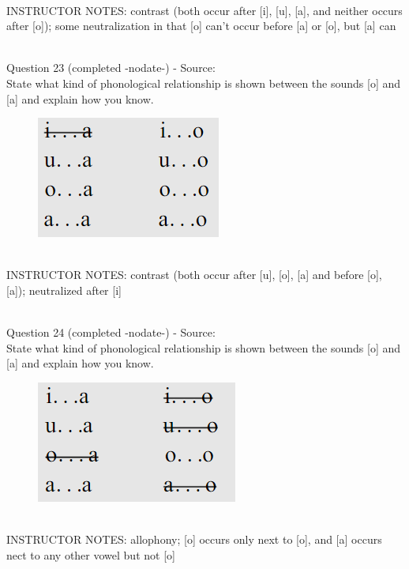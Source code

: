 \documentclass[12pt]{article}
\begin{document}
~\\
INSTRUCTOR NOTES: contrast (both occur after [i], [u], [a], and neither occurs after [o]); some neutralization in that [o] can't occur before [a] or [o], but [a] can


~\\

{\large Question 23} (completed -nodate-) - Source: \\

State what kind of phonological relationship is shown between the sounds [o] and [a] and explain how you know.\\

\begin{figure}[H]
\includegraphics{../images/peng70ao_b.png}
\end{figure}

~\\
INSTRUCTOR NOTES: contrast (both occur after [u], [o], [a] and before [o], [a]); neutralized after [i]


~\\

{\large Question 24} (completed -nodate-) - Source: \\

State what kind of phonological relationship is shown between the sounds [o] and [a] and explain how you know.\\

\begin{figure}[H]
\includegraphics{../images/peng70ao_c.png}
\end{figure}

~\\
INSTRUCTOR NOTES: allophony; [o] occurs only next to [o], and [a] occurs nect to any other vowel but not [o]
\end{document}
